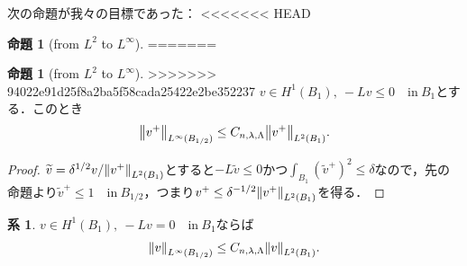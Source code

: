 \documentclass[a4paper]{ltjsarticle}
\newcommand{\inn}{\quad\text{in}\ }
\newcommand{\1}{\mathbbm{1}}
\numberwithin{equation}{section}
\theoremstyle{definition}
\newtheorem{cor}[thm]{系}
\newtheorem{prop}[thm]{命題}
\begin{document}
次の命題が我々の目標であった：
<<<<<<< HEAD
\begin{prop}[from $L^2$ to $L^\infty$]\label{prop:2_vs_infty}
=======
\begin{prop}[from $L^2$ to $L^\infty$]
>>>>>>> 94022e91d25f8a2ba5f58cada25422e2be352237
    $v\in H^1(B_1),\ -Lv\leq 0\inn B_1$とする．このとき
    \begin{equation}
        \norm{v^+}_{L^\infty(B_{1/2})}\leq C_{n,\lambda,\Lambda}\norm{v^+}_{L^2(B_1)}.
    \end{equation}
\end{prop}
\begin{proof}
    $\widetilde{v}=\delta^{1/2}v/\norm{v^+}_{L^2(B_1)}$とすると$-L\widetilde{v}\leq0$かつ$\int_{B_1}(\widetilde{v}^+)^2\leq\delta$なので，先の命題より$\widetilde{v}^+\leq1\inn B_{1/2}$，つまり$v^+\leq \delta^{-1/2}\norm{v^+}_{L^2(B_1)}$を得る．
\end{proof}
\begin{cor}
    $v\in H^{1}(B_1),\ -Lv=0\inn B_1$ならば
    \begin{equation}
        \norm{v}_{L^\infty(B_{1/2})}\leq C_{n,\lambda,\Lambda}\norm{v}_{L^2(B_1)}.
    \end{equation}
\end{cor}

\end{prop}
\end{document}
